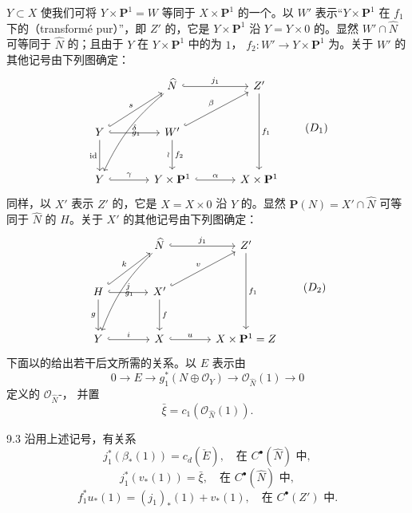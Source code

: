  $Y\subset X$ 使我们可将 $Y\times\mathbf P^1=W$ 等同于 $X\times\mathbf P^1$ 的一个。以 $W'$ 表示“$Y\times\mathbf P^1$ 在 $f_1$ 下的（transformé pur）”，即 $Z'$ 的，它是 $Y\times\mathbf P^1$ 沿 $Y=Y\times0$ 的。显然 $W'\cap\widehat N$ 可等同于 $\widehat N$ 的；且由于 $Y$ 在 $Y\times\mathbf P^1$ 中的为 $1$， $f_2:W'\to Y\times\mathbf P^1$ 为。关于 $W'$ 的其他记号由下列图确定：
\[
\begin{tikzcd}[column sep=large,row sep=large]
 &\widehat N\arrow[r,hook,"j_1"]\arrow[ddl,"g_1",bend right=12]&Z'\arrow[dd,"f_1"]\\
Y\arrow[ur,hook,"s"]\arrow[r,hook,"\delta"]\arrow[d,"\mathrm{id}"']&W'\arrow[ur,hook,"\beta"]\arrow[d,"f_2","\wr"']&\\
Y\arrow[r,hook,"\gamma"]&Y\times\mathbf P^1\arrow[r,hook,"\alpha"]&X\times\mathbf P^1
\end{tikzcd}\tag{$D_1$}
\]
同样，以 $X'$ 表示 $Z'$ 的，它是 $X=X\times0$ 沿 $Y$ 的。显然 $\mathbf P(N)=X'\cap\widehat N$ 可等同于 $\widehat N$ 的 $H$。关于 $X'$ 的其他记号由下列图确定：
\[
\begin{tikzcd}[column sep=large,row sep=large]
 &\widehat N\arrow[r,hook,"j_1"]\arrow[ddl,"g_1",bend right=12]&Z'\arrow[dd,"f_1"]\\
H\arrow[ur,hook,"k"]\arrow[r,hook,"j"]\arrow[d,"g"']&X'\arrow[ur,hook,"v"]\arrow[d,"f"]&\\
Y\arrow[r,hook,"i"]&X\arrow[r,hook,"u"]&X\times\mathbf P^1=Z
\end{tikzcd}\tag{$D_2$}
\]
下面以的给出若干后文所需的关系。以 $E$ 表示由
\[
 0\longrightarrow E\longrightarrow g_1^*(N\oplus\mathscr O_Y)\longrightarrow\mathscr O_{\widehat N}(1)\longrightarrow0
 \tag{9.3.0}
\]
定义的 $\mathscr O_{\widehat N}$-，
并置
\[
 \bar\xi=c_1(\mathscr O_{\widehat N}(1)).\tag{9.3.1}
\]
\begin{SGAresult}{}{9.3}
沿用上述记号，有关系
\[
 j_1^*(\beta_*(1))=c_d(\check E),\quad\text{在 }C^\bullet(\widehat N)\text{ 中},\tag{9.3.2}
\]
\[
 j_1^*(v_*(1))=\bar\xi,\quad\text{在 }C^\bullet(\widehat N)\text{ 中},\tag{9.3.3}
\]
\[
 f_1^*u_*(1)=(j_1)_*(1)+v_*(1),\quad\text{在 }C^\bullet(Z')\text{ 中}.\tag{9.3.4}
\]
\end{SGAresult}
